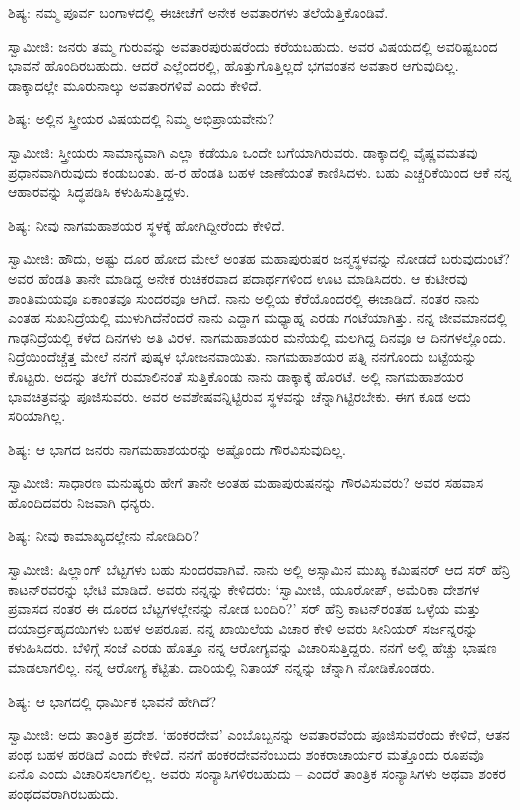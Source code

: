 ಶಿಷ್ಯ: ನಮ್ಮ ಪೂರ್ವ ಬಂಗಾಳದಲ್ಲಿ ಈಚೀಚೆಗೆ ಅನೇಕ ಅವತಾರಗಳು ತಲೆಯೆತ್ತಿಕೊಂಡಿವೆ.

ಸ್ವಾಮೀಜಿ: ಜನರು ತಮ್ಮ ಗುರುವನ್ನು ಅವತಾರಪುರುಷರೆಂದು ಕರೆಯಬಹುದು. ಅವರ ವಿಷಯದಲ್ಲಿ ಅವರಿಷ್ಟಬಂದ ಭಾವನೆ ಹೊಂದಿರಬಹುದು. ಆದರೆ ಎಲ್ಲೆಂದರಲ್ಲಿ, ಹೊತ್ತುಗೊತ್ತಿಲ್ಲದೆ ಭಗವಂತನ ಅವತಾರ ಆಗುವುದಿಲ್ಲ. ಡಾಕ್ಕಾದಲ್ಲೇ ಮೂರುನಾಲ್ಕು ಅವತಾರಗಳಿವೆ ಎಂದು ಕೇಳಿದೆ.

ಶಿಷ್ಯ: ಅಲ್ಲಿನ ಸ್ತ್ರೀಯರ ವಿಷಯದಲ್ಲಿ ನಿಮ್ಮ ಅಭಿಪ್ರಾಯವೇನು?

ಸ್ವಾಮೀಜಿ: ಸ್ತ್ರೀಯರು ಸಾಮಾನ್ಯವಾಗಿ ಎಲ್ಲಾ ಕಡೆಯೂ ಒಂದೇ ಬಗೆಯಾಗಿರುವರು. ಡಾಕ್ಕಾದಲ್ಲಿ ವೈಷ್ಣವಮತವು ಪ್ರಧಾನವಾಗಿರುವುದು ಕಂಡುಬಂತು. ಹ-ರ ಹೆಂಡತಿ ಬಹಳ ಜಾಣೆಯಂತೆ ಕಾಣಿಸಿದಳು. ಬಹು ಎಚ್ಚರಿಕೆಯಿಂದ ಆಕೆ ನನ್ನ ಆಹಾರವನ್ನು ಸಿದ್ಧಪಡಿಸಿ ಕಳುಹಿಸುತ್ತಿದ್ದಳು.

ಶಿಷ್ಯ: ನೀವು ನಾಗಮಹಾಶಯರ ಸ್ಥಳಕ್ಕೆ ಹೋಗಿದ್ದೀರೆಂದು ಕೇಳಿದೆ.

ಸ್ವಾಮೀಜಿ: ಹೌದು, ಅಷ್ಟು ದೂರ ಹೋದ ಮೇಲೆ ಅಂತಹ ಮಹಾಪುರುಷರ ಜನ್ಮಸ್ಥಳವನ್ನು ನೋಡದೆ ಬರುವುದುಂಟೆ? ಅವರ ಹೆಂಡತಿ ತಾನೇ ಮಾಡಿದ್ದ ಅನೇಕ ರುಚಿಕರವಾದ ಪದಾರ್ಥಗಳಿಂದ ಊಟ ಮಾಡಿಸಿದರು. ಆ ಕುಟೀರವು ಶಾಂತಿಮಯವೂ ಏಕಾಂತವೂ ಸುಂದರವೂ ಆಗಿದೆ. ನಾನು ಅಲ್ಲಿಯ ಕೆರೆಯೊಂದರಲ್ಲಿ ಈಜಾಡಿದೆ. ನಂತರ ನಾನು ಎಂತಹ ಸುಖನಿದ್ರೆಯಲ್ಲಿ ಮುಳುಗಿದೆನೆಂದರೆ ನಾನು ಎದ್ದಾಗ ಮಧ್ಯಾಹ್ನ ಎರಡು ಗಂಟೆಯಾಗಿತ್ತು. ನನ್ನ ಜೀವಮಾನದಲ್ಲಿ ಗಾಢನಿದ್ರೆಯಲ್ಲಿ ಕಳೆದ ದಿನಗಳು ಅತಿ ವಿರಳ. ನಾಗಮಹಾಶಯರ ಮನೆಯಲ್ಲಿ ಮಲಗಿದ್ದ ದಿನವೂ ಆ ದಿನಗಳಲ್ಲೊಂದು. ನಿದ್ರೆಯಿಂದೆಚ್ಚೆತ್ತ ಮೇಲೆ ನನಗೆ ಪುಷ್ಕಳ ಭೋಜನವಾಯಿತು. ನಾಗಮಹಾಶಯರ ಪತ್ನಿ ನನಗೊಂದು ಬಟ್ಟೆಯನ್ನು ಕೊಟ್ಟರು. ಅದನ್ನು ತಲೆಗೆ ರುಮಾಲಿನಂತೆ ಸುತ್ತಿಕೊಂಡು ನಾನು ಡಾಕ್ಕಾಕ್ಕೆ ಹೊರಟೆ. ಅಲ್ಲಿ ನಾಗಮಹಾಶಯರ ಭಾವಚಿತ್ರವನ್ನು ಪೂಜಿಸುವರು. ಅವರ ಅವಶೇಷವನ್ನಿಟ್ಟಿರುವ ಸ್ಥಳವನ್ನು ಚೆನ್ನಾಗಿಟ್ಟಿರಬೇಕು. ಈಗ ಕೂಡ ಅದು ಸರಿಯಾಗಿಲ್ಲ.

ಶಿಷ್ಯ: ಆ ಭಾಗದ ಜನರು ನಾಗಮಹಾಶಯರನ್ನು ಅಷ್ಟೊಂದು ಗೌರವಿಸುವುದಿಲ್ಲ.

ಸ್ವಾಮೀಜಿ: ಸಾಧಾರಣ ಮನುಷ್ಯರು ಹೇಗೆ ತಾನೇ ಅಂತಹ ಮಹಾಪುರುಷನನ್ನು ಗೌರವಿಸುವರು? ಅವರ ಸಹವಾಸ ಹೊಂದಿದವರು ನಿಜವಾಗಿ ಧನ್ಯರು.

ಶಿಷ್ಯ: ನೀವು ಕಾಮಾಖ್ಯದಲ್ಲೇನು ನೋಡಿದಿರಿ?

ಸ್ವಾಮೀಜಿ: ಷಿಲ್ಲಾಂಗ್ ಬೆಟ್ಟಗಳು ಬಹು ಸುಂದರವಾಗಿವೆ. ನಾನು ಅಲ್ಲಿ ಅಸ್ಸಾಮಿನ ಮುಖ್ಯ ಕಮಿಷನರ್ ಆದ ಸರ್ ಹೆನ್ರಿ ಕಾಟನ್‌ರವರನ್ನು ಭೇಟಿ ಮಾಡಿದೆ. ಅವರು ನನ್ನನ್ನು ಕೇಳಿದರು: ‘ಸ್ವಾಮೀಜಿ, ಯೂರೋಪ್, ಅಮೆರಿಕಾ ದೇಶಗಳ ಪ್ರವಾಸದ ನಂತರ ಈ ದೂರದ ಬೆಟ್ಟಗಳಲ್ಲೇನನ್ನು ನೋಡ ಬಂದಿರಿ?’ ಸರ್ ಹೆನ್ರಿ ಕಾಟನ್‌ರಂತಹ ಒಳ್ಳೆಯ ಮತ್ತು ದಯಾರ್ದ್ರಹೃದಯಿಗಳು ಬಹಳ ಅಪರೂಪ. ನನ್ನ ಖಾಯಿಲೆಯ ವಿಚಾರ ಕೇಳಿ ಅವರು ಸೀನಿಯರ್ ಸರ್ಜನ್ನರನ್ನು ಕಳುಹಿಸಿದರು. ಬೆಳಿಗ್ಗೆ ಸಂಜೆ ಎರಡು ಹೊತ್ತೂ ನನ್ನ ಆರೋಗ್ಯವನ್ನು ವಿಚಾರಿಸುತ್ತಿದ್ದರು. ನನಗೆ ಅಲ್ಲಿ ಹೆಚ್ಚು ಭಾಷಣ ಮಾಡಲಾಗಲಿಲ್ಲ. ನನ್ನ ಆರೋಗ್ಯ ಕೆಟ್ಟಿತು. ದಾರಿಯಲ್ಲಿ ನಿತಾಯ್ ನನ್ನನ್ನು ಚೆನ್ನಾಗಿ ನೋಡಿಕೊಂಡರು.

ಶಿಷ್ಯ: ಆ ಭಾಗದಲ್ಲಿ ಧಾರ್ಮಿಕ ಭಾವನೆ ಹೇಗಿದೆ?

ಸ್ವಾಮೀಜಿ: ಅದು ತಾಂತ್ರಿಕ ಪ್ರದೇಶ. ‘ಹಂಕರದೇವ’ ಎಂಬೊಬ್ಬನನ್ನು ಅವತಾರವೆಂದು ಪೂಜಿಸುವರೆಂದು ಕೇಳಿದೆ, ಆತನ ಪಂಥ ಬಹಳ ಹರಡಿದೆ ಎಂದು ಕೇಳಿದೆ. ನನಗೆ ಹಂಕರದೇವನೆಂಬುದು ಶಂಕರಾಚಾರ್ಯರ ಮತ್ತೊಂದು ರೂಪವೊ ಏನೊ ಎಂದು ವಿಚಾರಿಸಲಾಗಲಿಲ್ಲ. ಅವರು ಸಂನ್ಯಾಸಿಗಳಿರಬಹುದು – ಎಂದರೆ ತಾಂತ್ರಿಕ ಸಂನ್ಯಾಸಿಗಳು ಅಥವಾ ಶಂಕರ ಪಂಥದವರಾಗಿರಬಹುದು.

